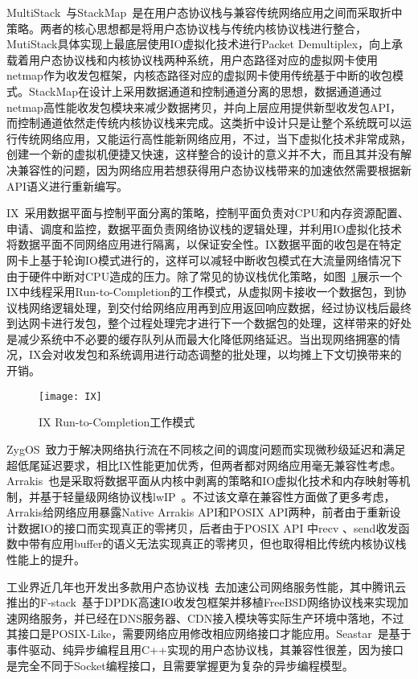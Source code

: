 MultiStack~\cite{Honda2014Rekindling}与StackMap~\cite{StackMap}是在用户态协议栈与兼容传统网络应用之间而采取折中策略。两者的核心思想都是将用户态协议栈与传统内核协议栈进行整合，MutiStack具体实现上最底层使用IO虚拟化技术进行Packet Demultiplex，向上承载着用户态协议栈和内核协议栈两种系统，用户态路径对应的虚拟网卡使用netmap作为收发包框架，内核态路径对应的虚拟网卡使用传统基于中断的收包模式。StackMap在设计上采用数据通道和控制通道分离的思想，数据通道通过netmap高性能收发包模块来减少数据拷贝，并向上层应用提供新型收发包API，而控制通道依然走传统内核协议栈来完成。这类折中设计只是让整个系统既可以运行传统网络应用，又能运行高性能新网络应用，不过，当下虚拟化技术非常成熟，创建一个新的虚拟机便捷又快速，这样整合的设计的意义并不大，而且其并没有解决兼容性的问题，因为网络应用若想获得用户态协议栈带来的加速依然需要根据新API语义进行重新编写。

IX~\cite{IX}采用数据平面与控制平面分离的策略，控制平面负责对CPU和内存资源配置、申请、调度和监控，数据平面负责网络协议栈的逻辑处理，并利用IO虚拟化技术将数据平面不同网络应用进行隔离，以保证安全性。IX数据平面的收包是在特定网卡上基于轮询IO模式进行的，这样可以减轻中断收包模式在大流量网络情况下由于硬件中断对CPU造成的压力。除了常见的协议栈优化策略，如图~\ref{fig:IX}展示一个IX中线程采用Run-to-Completion的工作模式，从虚拟网卡接收一个数据包，到协议栈网络逻辑处理，到交付给网络应用再到应用返回响应数据，经过协议栈后最终到达网卡进行发包，整个过程处理完才进行下一个数据包的处理，这样带来的好处是减少系统中不必要的缓存队列从而最大化降低网络延迟。当出现网络拥塞的情况，IX会对收发包和系统调用进行动态调整的批处理，以均摊上下文切换带来的开销。

\vspace{-10pt}
\begin{figure}[H] %
  \centering
  \texttt{[image: IX]}
  \caption{IX Run-to-Completion工作模式}
  \label{fig:IX}
\end{figure}
\vspace{-10pt}

ZygOS~\cite{ZygOS}致力于解决网络执行流在不同核之间的调度问题而实现微秒级延迟和满足超低尾延迟要求，相比IX性能更加优秀，但两者都对网络应用毫无兼容性考虑。Arrakis~\cite{Peter2015Arrakis}也是采取将数据平面从内核中剥离的策略和IO虚拟化技术和内存映射等机制，并基于轻量级网络协议栈lwIP~\cite{lwIP}。不过该文章在兼容性方面做了更多考虑，Arrakis给网络应用暴露Native Arrakis API和POSIX API两种，前者由于重新设计数据IO的接口而实现真正的零拷贝，后者由于POSIX API 中recv 、send收发函数中带有应用buffer的语义无法实现真正的零拷贝，但也取得相比传统内核协议栈性能上的提升。

工业界近几年也开发出多款用户态协议栈~\cite{libuinet,pope2011introduction,Seastar,fstack}去加速公司网络服务性能，其中腾讯云推出的F-stack~\cite{fstack}基于DPDK高速IO收发包框架并移植FreeBSD网络协议栈来实现加速网络服务，并已经在DNS服务器、CDN接入模块等实际生产环境中落地，不过其接口是POSIX-Like，需要网络应用修改相应网络接口才能应用。Seastar~\cite{Seastar}是基于事件驱动、纯异步编程且用C++实现的用户态协议栈，其兼容性很差，因为接口是完全不同于Socket编程接口，且需要掌握更为复杂的异步编程模型。